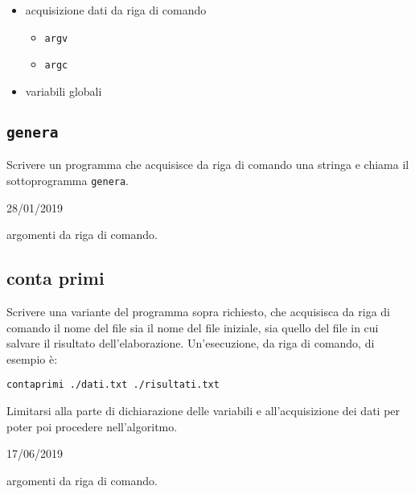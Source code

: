 \begin{itemize}
\item acquisizione dati da riga di comando
    \begin{itemize}
    \item \texttt{argv}
    \item \texttt{argc}
    \end{itemize}
\item variabili globali
\end{itemize}

\mysep{}

\subsection{\texttt{genera}}
Scrivere un programma che acquisisce da riga di comando una stringa e chiama il sottoprogramma \texttt{genera}.

\begin{esame}
28/01/2019
\end{esame}

\begin{tags}
argomenti da riga di comando.
\end{tags}


\subsection{conta primi}
Scrivere una variante del programma sopra richiesto, che acquisisca da riga di comando il nome del file sia il nome del file iniziale, sia quello del file in cui salvare il risultato dell'elaborazione. Un'esecuzione, da riga di comando, di esempio \`e:
\begin{verbatim}
contaprimi ./dati.txt ./risultati.txt
\end{verbatim}
Limitarsi alla parte di dichiarazione delle variabili e all'acquisizione dei dati per poter poi procedere nell'algoritmo.

\begin{esame}
17/06/2019
\end{esame}

\begin{tags}
argomenti da riga di comando.
\end{tags}



